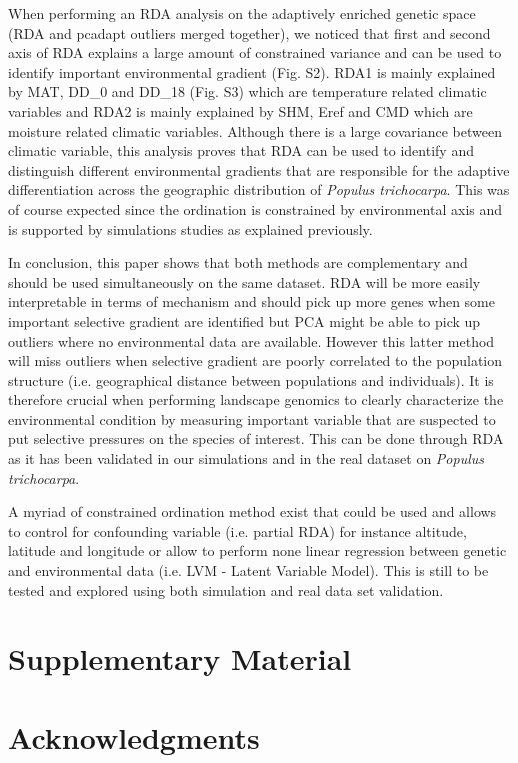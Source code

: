 \documentclass[a4paper,times,10pt,authoryear]{article}%
\begin{document}
When performing an RDA analysis on the adaptively enriched genetic space (RDA and pcadapt outliers merged together), we noticed that first and second axis of RDA explains a large amount of constrained variance and can be used to identify important environmental gradient (Fig. S2). RDA1 is mainly explained by MAT, DD\_0 and DD\_18 (Fig. S3) which are temperature related climatic variables and RDA2 is mainly explained by SHM, Eref and CMD which are moisture related climatic variables. Although there is a large covariance between climatic variable, this analysis proves that RDA can be used to identify and distinguish different environmental gradients that are responsible for the adaptive differentiation across the geographic distribution of \textit{Populus trichocarpa}. This was of course expected since the ordination is constrained by environmental axis and is supported by simulations studies as explained previously.

In conclusion, this paper shows that both methods are complementary and should be used simultaneously on the same dataset. RDA will be more easily interpretable in terms of mechanism and should pick up more genes when some important selective gradient are identified but PCA might be able to pick up outliers where no environmental data are available. However this latter method will miss outliers when selective gradient are poorly correlated to the population structure (i.e. geographical distance between populations and individuals). It is therefore crucial when performing landscape genomics to clearly characterize the environmental condition by measuring important variable that are suspected to put selective pressures on the species of interest. This can be done through RDA as it has been validated in our simulations and in the real dataset on \textit{Populus trichocarpa}. 

A myriad of constrained ordination method exist that could be used and allows to control for confounding variable (i.e. partial RDA) for instance altitude, latitude and longitude or allow to perform none linear regression between genetic and environmental data (i.e. LVM - Latent Variable Model). This is still to be tested and explored using both simulation and real data set validation.


\section{Supplementary Material}


\section{Acknowledgments}
\end{document}
